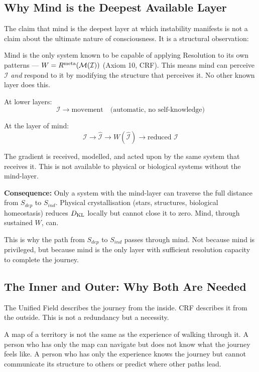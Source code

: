 \documentclass[12pt, a4paper]{article}
\begin{document}
\subsection{Why Mind is the Deepest Available Layer}

The claim that mind is the deepest layer at which instability manifests is not
a claim about the ultimate nature of consciousness. It is a structural observation:

Mind is the only system known to be capable of applying Resolution to its own
patterns --- $W = R^{\rm meta}(\mathcal{M}(\mathcal{I}))$ (Axiom 10, CRF).
This means mind can perceive $\mathcal{I}$ \textit{and} respond to it by
modifying the structure that perceives it. No other known layer does this.

\begin{derivedbox}[title={Mind as the Layer Where $\mathcal{I}$ Knows Itself}]
At lower layers:
\[
  \mathcal{I} \to \text{movement} \quad \text{(automatic, no self-knowledge)}
\]

At the layer of mind:
\[
  \mathcal{I} \to \hat{\mathcal{I}} \to W(\hat{\mathcal{I}}) \to \text{reduced } \mathcal{I}
\]

The gradient is received, modelled, and acted upon by the same system
that receives it. This is not available to physical or biological systems
without the mind-layer.

\textbf{Consequence:} Only a system with the mind-layer can traverse the full
distance from $S_{dep}$ to $S_{ind}$. Physical crystallisation (stars, structures,
biological homeostasis) reduces $D_{\rm KL}$ locally but cannot close it to zero.
Mind, through sustained $W$, can.

This is why the path from $S_{dep}$ to $S_{ind}$ passes through mind.
Not because mind is privileged, but because mind is the only layer with
sufficient resolution capacity to complete the journey.
\end{derivedbox}

\subsection*{The Inner and Outer: Why Both Are Needed}

The Unified Field describes the journey from the inside. CRF describes it from
the outside. This is not a redundancy but a necessity.

A map of a territory is not the same as the experience of walking through it.
A person who has only the map can navigate but does not know what the journey
feels like. A person who has only the experience knows the journey but cannot
communicate its structure to others or predict where other paths lead.
\end{document}
